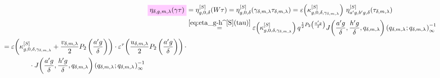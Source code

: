 \documentclass{article}
\begin{document}
\begin{align}
  \defineNotation[eta-delta-g-m-lambda-gamma-tau-Robins]
    {\eta_{\delta,g,m,\lambda}(\gamma\tau)}
  &=
    \eta_{g,0,\delta}^{[S]}(W\tau)
  =
    \eta_{g,0,\delta}^{[S]}(\gamma_{\delta,m,\lambda}\tau_{\delta,m,\lambda})
   =
    \unityPower{\kappa_{g,0,\delta,\gamma_{\delta,m,\lambda}}^{[S]}}\,
    \eta_{a' g, b' g,\delta}^{[S]}(\tau_{\delta,m,\lambda})
  \notag\\
  &\eqby{eq:eta_g-h^[S](tau)}
    \unityPower{\kappa_{g,0,\delta,\gamma_{\delta,m,\lambda}}^{[S]}}
  q^{\frac{1}{2} P_2
    \left(\frac{a'g}{\delta}\right)}
    \jacobiAlpha{\frac{a' g}{\delta}}{\frac{h' g}{\delta}}{q_{\delta,m,\lambda}}
    \eulerFunction[q_{\delta,m,\lambda}]{}^{-1}
    \notag\\
  \begin{split}
    &=
    \unityPower{
      \kappa_{g,0,\delta,\gamma_{\delta,m,\lambda}}^{[S]}
      +
      \frac{v_{\delta,m,\lambda}}{2} P_2\left(\frac{a' g}{\delta}\right)
    }
    \cdot
    \unityPowerTau{
      \frac{u_{\delta,m,\lambda}}{2} P_2\left(\frac{a' g}{\delta}\right)}
    \cdot
    \\
    &\qquad\qquad
    \cdot
    \jacobiAlpha{\frac{a' g}{\delta}}{\frac{h' g}{\delta}}{q_{\delta,m,\lambda}}
    \eulerFunction[q_{\delta,m,\lambda}]{}^{-1}
  \end{split}
  \label{eq:eta_delta-g-m-lambda^[R](gamma*tau)}
\end{align}
\end{document}
